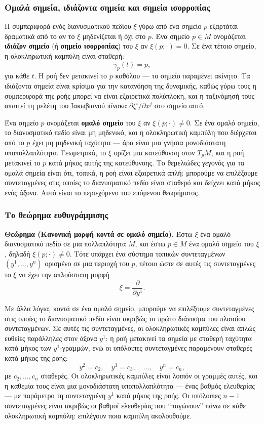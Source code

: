 \documentclass[12pt]{article}
\begin{document}
\subsubsection{Ομαλά σημεία, ιδιάζοντα σημεία και σημεία ισορροπίας}

Η συμπεριφορά ενός διανυσματικού πεδίου $\xi$ γύρω από ένα σημείο $p$ εξαρτάται δραματικά από το αν το $\xi$ μηδενίζεται ή όχι στο $p$. Ένα σημείο $p \in M$ ονομάζεται \textbf{ιδιάζον σημείο} (ή \textbf{σημείο ισορροπίας}) του $\xi$ αν $\xi(p; \cdot) = 0$. Σε ένα τέτοιο σημείο, η ολοκληρωτική καμπύλη είναι σταθερή:
\[
\gamma_p(t) = p,
\]
για κάθε $t$. Η ροή δεν μετακινεί το $p$ καθόλου --- το σημείο παραμένει ακίνητο. Τα ιδιάζοντα σημεία είναι κρίσιμα για την κατανόηση της δυναμικής, καθώς γύρω τους η συμπεριφορά της ροής μπορεί να είναι εξαιρετικά πολύπλοκη, και η ταξινόμησή τους απαιτεί τη μελέτη του Ιακωβιανού πίνακα $\partial \xi^i / \partial x^j$ στο σημείο αυτό.

Ένα σημείο $p$ ονομάζεται \textbf{ομαλό σημείο} του $\xi$ αν $\xi(p; \cdot) \neq 0$. Σε ένα ομαλό σημείο, το διανυσματικό πεδίο είναι μη μηδενικό, και η ολοκληρωτική καμπύλη που διέρχεται από το $p$ έχει μη μηδενική ταχύτητα --- άρα είναι μια γνήσια μονοδιάστατη υποπολλαπλότητα. Γεωμετρικά, το $\xi$ ορίζει μια κατεύθυνση στον $T_pM$, και η ροή μετακινεί το $p$ κατά μήκος αυτής της κατεύθυνσης. Το θεμελιώδες γεγονός για τα ομαλά σημεία είναι ότι, τοπικά, η ροή είναι εξαιρετικά απλή: μπορούμε να επιλέξουμε συντεταγμένες στις οποίες το διανυσματικό πεδίο είναι σταθερό και δείχνει κατά μήκος ενός άξονα. Αυτό είναι το περιεχόμενο του επόμενου θεωρήματος.

\subsubsection{Το θεώρημα ευθυγράμμισης}

\textbf{Θεώρημα (Κανονική μορφή κοντά σε ομαλό σημείο).} Έστω $\xi$ ένα ομαλό διανυσματικό πεδίο σε μια πολλαπλότητα $M$, και έστω $p \in M$ ένα ομαλό σημείο του $\xi$, δηλαδή $\xi(p; \cdot) \neq 0$. Τότε υπάρχει ένα σύστημα τοπικών συντεταγμένων $(y^1, \dots, y^n)$ ορισμένο σε μια περιοχή του $p$, τέτοιο ώστε σε αυτές τις συντεταγμένες το $\xi$ να έχει την απλούστατη μορφή
\[
\xi = \frac{\partial}{\partial y^1}. \tag{0.22}
\]

Με άλλα λόγια, κοντά σε ένα ομαλό σημείο, μπορούμε να επιλέξουμε συντεταγμένες στις οποίες το διανυσματικό πεδίο είναι ακριβώς το πρώτο διάνυσμα του πλαισίου συντεταγμένων. Σε αυτές τις συντεταγμένες, οι ολοκληρωτικές καμπύλες είναι απλώς ευθείες παράλληλες στον άξονα $y^1$: η ροή μετακινεί τα σημεία με σταθερή ταχύτητα κατά μήκος των $y^1$-γραμμών, ενώ οι υπόλοιπες συντεταγμένες παραμένουν σταθερές κατά μήκος της ροής:
\[
y^2 = c_2, \quad y^3 = c_3, \quad \dots, \quad y^n = c_n,
\]
με $c_2, \dots, c_n$ σταθερές. Οι ολοκληρωτικές καμπύλες είναι λοιπόν οι γραμμές αυτές, και η καθεμία τους είναι μια μονοδιάστατη υποπολλαπλότητα --- ένας βαθμός ελευθερίας --- με παράμετρο τη συντεταγμένη $y^1$ κατά μήκος της ροής. Οι υπόλοιπες $n-1$ συντεταγμένες είναι ακριβώς οι βαθμοί ελευθερίας που ``παγώνουν'' πάνω σε κάθε ολοκληρωτική καμπύλη: επιλέγουν ποια καμπύλη ακολουθούμε.
\end{document}
